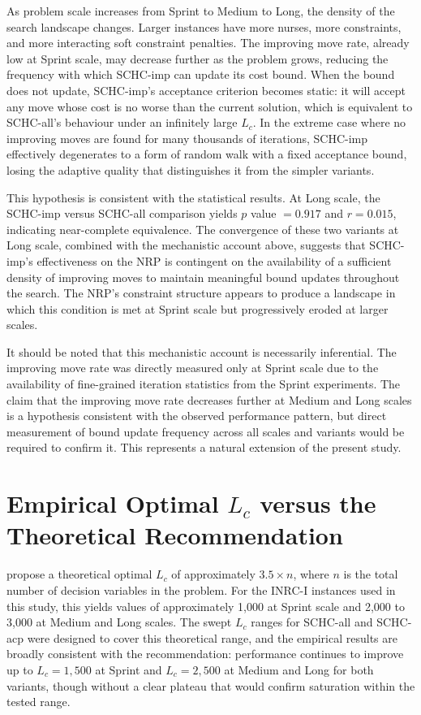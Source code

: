 \documentclass[12pt, a4paper, oneside]{report}
\begin{document}
As problem scale increases from Sprint to Medium to Long, the density
of the search landscape changes. Larger instances have more nurses,
more constraints, and more interacting soft constraint penalties. The
improving move rate, already low at Sprint scale, may decrease
further as the problem grows, reducing the frequency with which
SCHC-imp can update its cost bound. When the bound does not update,
SCHC-imp's acceptance criterion becomes static: it will accept any
move whose cost is no worse than the current solution, which is
equivalent to SCHC-all's behaviour under an infinitely large $L_c$.
In the extreme case where no improving moves are found for many
thousands of iterations, SCHC-imp effectively degenerates to a form
of random walk with a fixed acceptance bound, losing the adaptive
quality that distinguishes it from the simpler variants.

This hypothesis is consistent with the statistical results. At Long
scale, the SCHC-imp versus SCHC-all comparison yields $p$ value $= 0.917$
and $r = 0.015$, indicating near-complete equivalence. The
convergence of these two variants at Long scale, combined with the
mechanistic account above, suggests that SCHC-imp's effectiveness on
the NRP is contingent on the availability of a sufficient density of
improving moves to maintain meaningful bound updates throughout the
search. The NRP's constraint structure appears to produce a landscape
in which this condition is met at Sprint scale but progressively
eroded at larger scales.

It should be noted that this mechanistic account is necessarily
inferential. The improving move rate was directly measured only at
Sprint scale due to the availability of fine-grained iteration
statistics from the Sprint experiments. The claim that the improving
move rate decreases further at Medium and Long scales is a
hypothesis consistent with the observed performance pattern, but
direct measurement of bound update frequency across all scales and
variants would be required to confirm it. This represents a natural
extension of the present study.

\section{Empirical Optimal \texorpdfstring{$L_c$}{Lc} versus the Theoretical Recommendation}
\label{sec:disc_theoretical_lc}

\citet{Bykov2016} propose a theoretical optimal $L_c$ of
approximately $3.5 \times n$, where $n$ is the total number of
decision variables in the problem. For the INRC-I instances used in
this study, this yields values of approximately 1,000 at Sprint scale
and 2,000 to 3,000 at Medium and Long scales. The swept $L_c$ ranges
for SCHC-all and SCHC-acp were designed to cover this theoretical
range, and the empirical results are broadly consistent with the
recommendation: performance continues to improve up to $L_c = 1{,}500$
at Sprint and $L_c = 2{,}500$ at Medium and Long for both variants,
though without a clear plateau that would confirm saturation within
the tested range.
\end{document}
